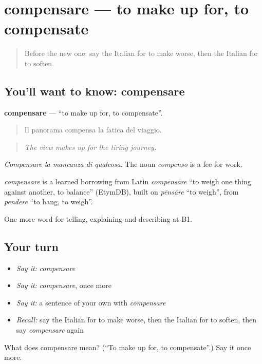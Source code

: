 \section[compensare]{compensare — to make up for, to compensate}

\label{lesson:IT-C355-compensare}



\begin{quote}
Before the new one: say the Italian for to make worse, then the Italian for to soften.
\end{quote}

\subsection*{You'll want to know: compensare}
\textbf{compensare} — \textquotedblleft{}to make up for, to compensate\textquotedblright{}.

\begin{quote}
Il panorama compensa la fatica del viaggio.
\end{quote}

\begin{quote}
\emph{The view makes up for the tiring journey.}
\end{quote}

\emph{Compensare la mancanza di qualcosa}. The noun \emph{compenso} is a fee for work.

\begin{cousinweb}
\emph{compensare} is a learned borrowing from Latin \emph{compēnsāre} \textquotedblleft{}to weigh one thing against another, to balance\textquotedblright{} (EtymDB), built on \emph{pēnsāre} \textquotedblleft{}to weigh\textquotedblright{}, from \emph{pendere} \textquotedblleft{}to hang, to weigh\textquotedblright{}.
\end{cousinweb}

\begin{grammarlens}[title={What you've built}]
One more word for telling, explaining and describing at B1.
\end{grammarlens}

\subsection*{Your turn}
\begin{itemize}
\raggedright
  \item \emph{Say it:} \emph{compensare}
  \item \emph{Say it:} \emph{compensare}, once more
  \item \emph{Say it:} a sentence of your own with \emph{compensare}
  \item \emph{Recall:} say the Italian for to make worse, then the Italian for to soften, then say \emph{compensare} again
\end{itemize}

\begin{tcolorbox}[breakable,colback=teal!4,colframe=teal!35!black,title={Before you move on}]
What does compensare mean? (\textquotedblleft{}To make up for, to compensate\textquotedblright{}.) Say it once more.
\end{tcolorbox}
